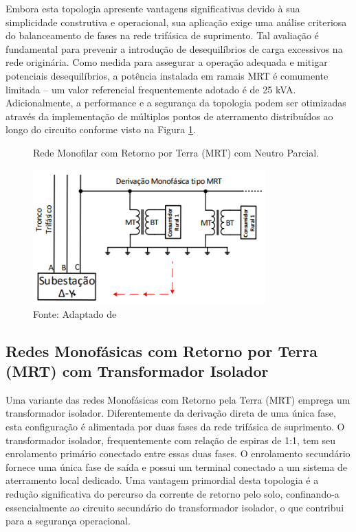 \documentclass[oneside,openright,12pt]{ufsm_2021} %
\begin{document}
\par Embora esta topologia apresente vantagens significativas devido à sua simplicidade construtiva e operacional, sua aplicação exige uma análise criteriosa do balanceamento de fases na rede trifásica de suprimento. Tal avaliação é fundamental para prevenir a introdução de desequilíbrios de carga excessivos na rede originária. Como medida para assegurar a operação adequada e mitigar potenciais desequilíbrios, a potência instalada em ramais MRT é comumente limitada – um valor referencial frequentemente adotado é de 25 kVA. Adicionalmente, a performance e a segurança da topologia podem ser otimizadas através da implementação de múltiplos pontos de aterramento distribuídos ao longo do circuito conforme visto na Figura \ref{fig:RedeMonofasicaComRetornoPorTerraNeutroParcialAdptadoFandi2013}.

\begin{figure}[H]
	\centering
	\caption{Rede Monofilar com Retorno por Terra (MRT) com Neutro Parcial.}
	\includegraphics[width=0.8\textwidth]{figuras/Imagem2Fandi2013.png}
	\caption*{Fonte: Adaptado de \cite{fandi_sistema_2013}}
	\label{fig:RedeMonofasicaComRetornoPorTerraNeutroParcialAdptadoFandi2013}
\end{figure}

\subsection{Redes Monofásicas com Retorno por Terra (MRT) com Transformador Isolador}

\par Uma variante das redes Monofásicas com Retorno pela Terra (MRT) emprega um transformador isolador. Diferentemente da derivação direta de uma única fase, esta configuração é alimentada por duas fases da rede trifásica de suprimento. O transformador isolador, frequentemente com relação de espiras de 1:1, tem seu enrolamento primário conectado entre essas duas fases. O enrolamento secundário fornece uma única fase de saída e possui um terminal conectado a um sistema de aterramento local dedicado. Uma vantagem primordial desta topologia é a redução significativa do percurso da corrente de retorno pelo solo, confinando-a essencialmente ao circuito secundário do transformador isolador, o que contribui para a segurança operacional.
\end{document}

